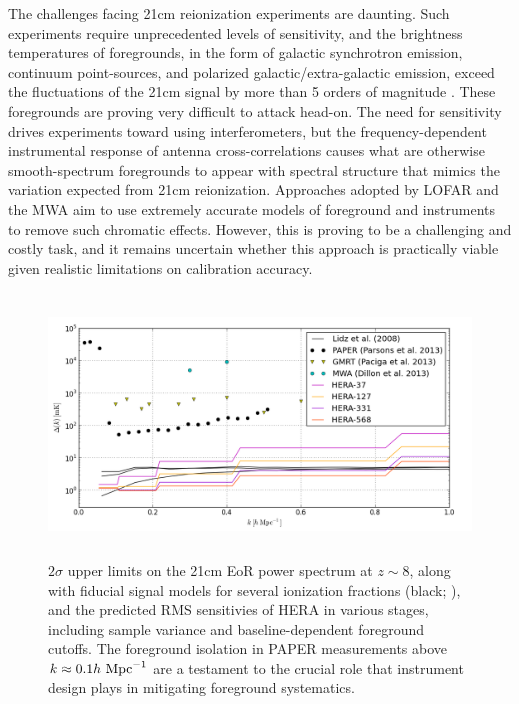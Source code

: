 \documentclass[preprint]{aastex}
\begin{document}
The challenges facing 21cm reionization experiments are daunting.  
Such experiments require unprecedented levels of sensitivity, and
the brightness temperatures of foregrounds, in the form of
galactic synchrotron emission, continuum point-sources, and polarized
galactic/extra-galactic emission, exceed the fluctuations of the 21cm signal by
more than 5 orders of magnitude
\citep{santos_et_al2005,pritchard_loeb2012,pober_et_al2013b}.
These foregrounds are proving very difficult to attack
head-on.  The need for sensitivity drives experiments toward
using interferometers, but the frequency-dependent instrumental
response of antenna cross-correlations 
causes what are otherwise smooth-spectrum foregrounds to 
appear with spectral structure that mimics the variation expected from 21cm reionization.
Approaches adopted by LOFAR and the MWA aim to use extremely accurate models of
foreground and instruments to
remove such chromatic effects.  However, this is proving to be a
challenging and costly task, and it remains uncertain whether this approach is
practically viable given realistic limitations on calibration accuracy.

\begin{figure}[!ht]\centering
\includegraphics[height=2.75in]{plots/eor_pspec.png}
\caption{\small
$2\sigma$ upper limits on the 21cm EoR power spectrum at $z\sim8$, along
with fiducial signal models for several ionization fractions (black;
\citealt{lidz_et_al2008}),
and the predicted RMS sensitivies of HERA in various stages, including sample variance
and baseline-dependent foreground cutoffs.
The foreground isolation in PAPER measurements
above $k\approx0.1h\ {\rm Mpc}^{-1}$
are a testament to the crucial role that instrument design
plays in mitigating foreground systematics.
}\label{fig:eor_pspec}
\end{figure}
\end{document}
